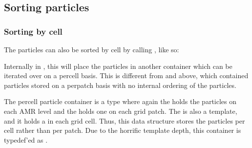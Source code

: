 \documentclass[letterpaper,10pt,english]{sphinxmanual}
\begin{document}
\subsection{Sorting particles}
\label{\detokenize{Source/Particles:sorting-particles}}

\subsubsection{Sorting by cell}
\label{\detokenize{Source/Particles:sorting-by-cell}}
The particles can also be sorted by cell by calling , like so:

\begin{sphinxVerbatim}[commandchars=\\\{\},formatcom=\scriptsize]
 

\end{sphinxVerbatim}

Internally in , this will place the particles in another container which can be iterated over on a per\sphinxhyphen{}cell basis.
This is different from  and  above, which contained particles stored on a per\sphinxhyphen{}patch basis with no internal ordering of the particles.

The per\sphinxhyphen{}cell particle container is a  type where again the  holds the particles on each AMR level and the  holds one  on each grid patch.
The  is also a template, and it holds a  in each grid cell.
Thus, this data structure stores the particles per cell rather than per patch.
Due to the horrific template depth, this container is typedef’ed as .
\end{document}
